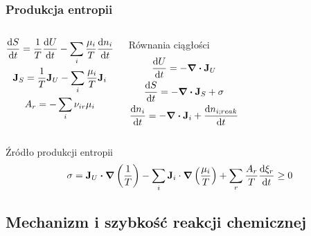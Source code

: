 \documentclass{beamer}
\begin{document}
\begin{frame}
\frametitle{Produkcja entropii}
\begin{columns}
\begin{block}{}
\begin{gather*}
\dv{S}{t}=\frac{1}{T}\dv{U}{t}-\sum_{i}\frac{\mu_{i}}{T}\dv{n_{i}}{t} \\
\vb{J}_{S}=\frac{1}{T}\vb{J}_{U}-\sum_{i}\frac{\mu_{i}}{T}\vb{J}_{i} \\
A_{r}=-\sum_{i}\nu_{ir}\mu_{i}
\end{gather*}
\end{block}
\begin{block}{Równania ciągłości}
\begin{gather*}
	\dv{U}{t}=-\div{\vb{J}_{U}} \\
	\dv{S}{t} = -\div{\vb{J}_{S}} + \sigma \\
	\dv{n_{i}}{t}=-\div{\vb{J}_{i}}+\dv{n_{i;reak}}{t}
\end{gather*}
\end{block}
\end{columns}
\begin{block}{Źródło produkcji entropii}
\begin{equation*}
\sigma=\vb{J}_{U}\vdot\grad{\left(\frac{1}{T}\right)}-\sum_{i}\vb{J}_{i}\cdot\grad{\left(\frac{\mu_{i}}{T}\right)}+\sum_{r}\frac{A_{r}}{T}\dv{\xi_{r}}{t}\geq0
\end{equation*}
\end{block}
\end{frame}

\subsection{Mechanizm i szybkość reakcji chemicznej}
\end{document}
